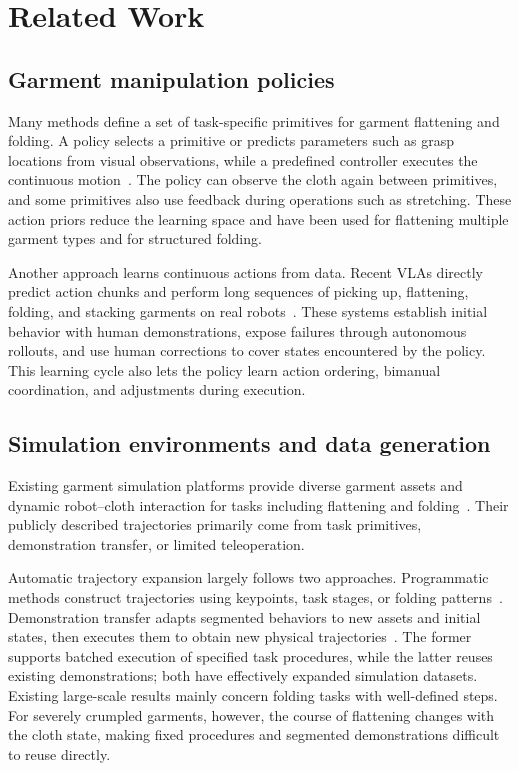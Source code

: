 \section{Related Work}
\label{sec:related-work}

\subsection{Garment manipulation policies}

Many methods define a set of task-specific primitives for garment flattening
and folding. A policy selects a primitive or predicts parameters such as grasp
locations from visual observations, while a predefined controller executes
the continuous motion~\cite{flingbot,clothmate,clothfunnels,speedfolding,unifolding}.
The policy can observe the cloth again between primitives, and some primitives
also use feedback during operations such as stretching. These action priors
reduce the learning space and have been used for flattening multiple garment
types and for structured folding.

Another approach learns continuous actions from data. Recent VLAs directly
predict action chunks and perform long sequences of picking up, flattening,
folding, and stacking garments on real robots~\cite{pistar06,chi0,demavla}.
These systems establish initial behavior with human demonstrations, expose
failures through autonomous rollouts, and use human corrections to cover
states encountered by the policy. This learning cycle also lets the policy
learn action ordering, bimanual coordination, and adjustments during execution.

\subsection{Simulation environments and data generation}

Existing garment simulation platforms provide diverse garment assets and
dynamic robot--cloth interaction for tasks including flattening and
folding~\cite{garmentlab,dexgarmentlab,lehome,simweaver}. Their publicly
described trajectories primarily come from task primitives, demonstration
transfer, or limited teleoperation.

Automatic trajectory expansion largely follows two approaches. Programmatic
methods construct trajectories using keypoints, task stages, or folding
patterns~\cite{foldnet,instantfold}. Demonstration transfer adapts segmented
behaviors to new assets and initial states, then executes them to obtain new
physical trajectories~\cite{softmimicgen,sim1}. The former supports batched
execution of specified task procedures, while the latter reuses existing
demonstrations; both have effectively expanded simulation datasets. Existing
large-scale results mainly concern folding tasks with well-defined steps.
For severely crumpled garments, however, the course of flattening changes with
the cloth state, making fixed procedures and segmented demonstrations
difficult to reuse directly.


